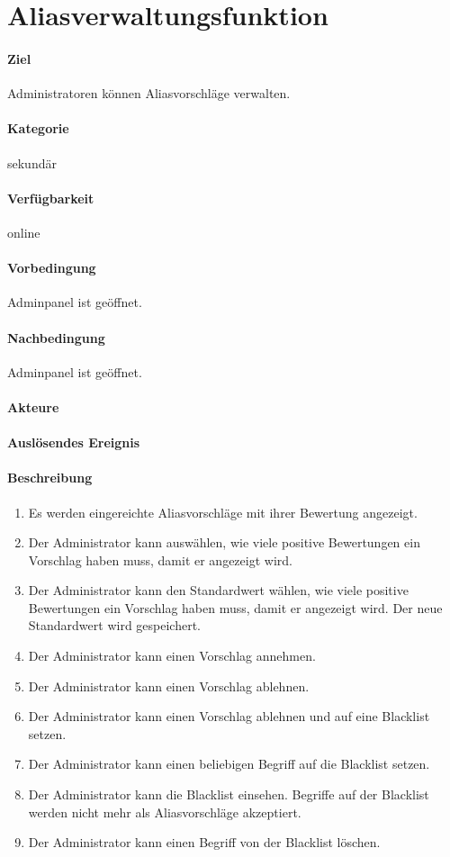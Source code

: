 \section{Aliasverwaltungsfunktion}
\label{Aliasverwaltungsfunktion}
\paragraph{Ziel}
Administratoren können Aliasvorschläge verwalten.
\paragraph{Kategorie}
sekundär
\paragraph{Verfügbarkeit}
online
\paragraph{Vorbedingung}
Adminpanel ist geöffnet.
\paragraph{Nachbedingung}
Adminpanel ist geöffnet.
\paragraph{Akteure}

\paragraph{Auslösendes Ereignis}

\paragraph{Beschreibung}
\begin{enumerate}
    \item Es werden eingereichte Aliasvorschläge mit ihrer Bewertung angezeigt.
    \item Der Administrator kann auswählen, wie viele positive Bewertungen ein Vorschlag haben muss, damit er angezeigt wird.
    \item Der Administrator kann den Standardwert wählen, wie viele positive Bewertungen ein Vorschlag haben muss, damit er angezeigt wird. Der neue Standardwert wird gespeichert.
    \item Der Administrator kann einen Vorschlag annehmen.
    \item Der Administrator kann einen Vorschlag ablehnen.
    \item Der Administrator kann einen Vorschlag ablehnen und auf eine Blacklist setzen.
    \item Der Administrator kann einen beliebigen Begriff auf die Blacklist setzen.
    \item Der Administrator kann die Blacklist einsehen. Begriffe auf der Blacklist werden nicht mehr als Aliasvorschläge akzeptiert.
    \item Der Administrator kann einen Begriff von der Blacklist löschen.
\end{enumerate}